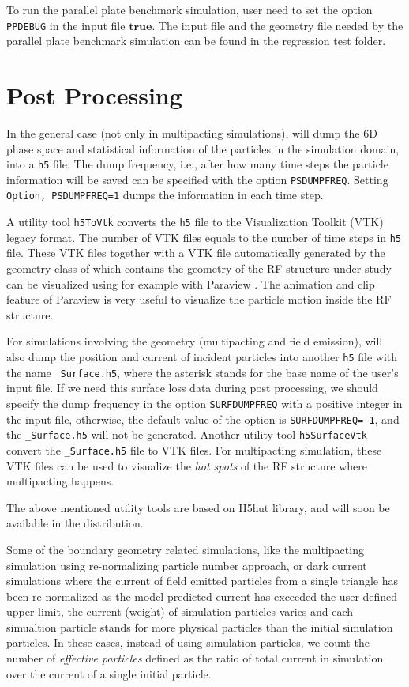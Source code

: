 To run the parallel plate benchmark simulation, user need to set the option {\tt PPDEBUG} in the input file $\mathbf{true}$. The input file and the geometry file needed by the parallel plate benchmark simulation can be found in the regression test folder. 
\clearpage
\section{Post Processing}
\label{sec:Post_Processing}
In the general case (not only in multipacting simulations), \opal will dump the $6$D phase space and statistical information of the particles in the simulation domain, into a {\tt h5} file. The dump frequency, i.e., after how many time steps the particle information will be saved can be specified with the option {\tt PSDUMPFREQ}. Setting {\tt Option, PSDUMPFREQ=1} dumps the information in each time step. 

A utility tool {\tt h5ToVtk}  converts the {\tt h5} file to the Visualization Toolkit (VTK) legacy format. The number of VTK files equals to the number of time steps in {\tt h5} file. These VTK files together with a VTK file automatically generated by the geometry class of \opal which contains the geometry of the RF structure under study can be visualized using for example with Paraview \cite{paraview}. The animation and clip feature of Paraview is very useful to visualize the particle motion inside the RF structure. 

For simulations involving the geometry (multipacting and field emission), \opal will also dump the position and current of incident particles into another {\tt h5} file with the name {\tt *\_Surface.h5}, where the asterisk stands for the base name of the user's \opal input file. If we need this surface loss data during post processing, we should specify the dump frequency in the option {\tt SURFDUMPFREQ} with a positive integer in the \opal input file, otherwise, the default value of the option is {\tt SURFDUMPFREQ=-1}, and the {\tt *\_Surface.h5} will not be generated. Another utility tool {\tt h5SurfaceVtk}  convert the {\tt *\_Surface.h5}  file to VTK files. For multipacting simulation, these VTK files can be used to visualize the {\em hot spots} of the RF structure where multipacting happens. 

The above mentioned utility tools are based on H5hut library, and will soon be available in the distribution.

Some of the boundary geometry related simulations, like the multipacting simulation using re-normalizing particle number approach, or dark current simulations where the current of field emitted particles from a single triangle has been re-normalized as the model predicted current has exceeded the user defined upper limit, the current (weight) of simulation particles varies and each simualtion particle stands for more physical particles than the initial simulation particles. In these cases, instead of using simulation particles, we count the number of {\em effective particles} defined as the ratio of total current in simulation over the current of a single initial particle.


